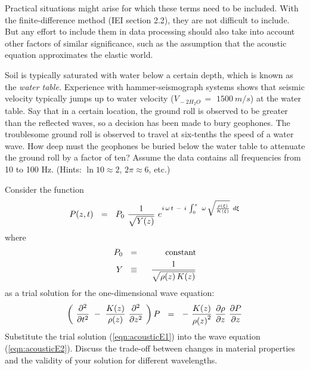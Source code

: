 {Practical situations might arise for which these terms need to be included.
With the finite-difference method (IEI section 2.2),
they are not difficult to include.
But any effort to include them in data processing
should also take into account other factors of similar significance,
such as the assumption
that the acoustic equation approximates the elastic world.
\begin{exer}
\item
Soil is typically saturated with water below a certain depth,
which is known as the
{\em 
water table.
}
Experience with hammer-seismograph systems shows that
seismic velocity typically jumps up
to water velocity ($V_{{} -2 { H_2 O}}\,=$ $ 1500 \ m/s$)
at the water table.
Say that in a certain location, the ground roll is observed to
be greater than the reflected waves,
so a decision has been made to bury geophones.
The troublesome ground roll is observed to
travel at six-tenths the speed of a water wave.
How deep must the geophones be buried below the water table to attenuate
the ground roll by a factor of ten?
Assume the data contains all frequencies from 10 to 100 Hz.
(Hints: $\ln 10 \approx 2$, $2 \pi \approx 6$, etc.)
\item
Consider the function
\begin{equation}
P ( z , t ) \ \  = \ \ 
P_0 \  {1 \over  \sqrt { Y ( z ) } } \ 
e^{ i \, \omega \, t\  - \  i \,  \int_0^z \ 
\omega \, \sqrt { { \rho ( \xi )   \over  K ( \xi ) } } \  d \xi }
\label{eqn:acousticE1}
\end{equation}
where
\begin{eqnarray*}
P_0 \ \ & = &\ \  \hbox{constant} \\
Y \ \ & \equiv &\ \  {1 \over  \sqrt { \rho ( z ) \, K ( z ) } }
\end{eqnarray*}
as a trial solution for the one-dimensional
wave equation:
\begin{equation}
\left( \ { \partial^2   \over  \partial t^2 } \  - \ 
{ K ( z )   \over  \rho ( z ) }
\  { \partial^2   \over  \partial z^2 } \  \right) P \ \  = \ \ 
- \  { K ( z )   \over  { \rho ( z ) }^2 } \ 
{ \partial \rho   \over  \partial z } \  { \partial P   \over  \partial z }
\label{eqn:acousticE2}
\end{equation}
Substitute the trial solution (\ref{eqn:acousticE1})
into the wave equation  (\ref{eqn:acousticE2}).
Discuss the trade-off between changes
in material properties and the validity of your
solution for different wavelengths.
\end{exer}
}

                                                                        







